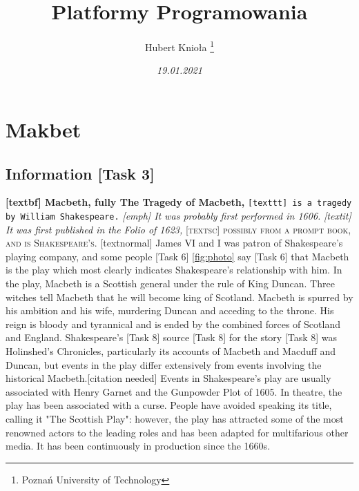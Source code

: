 \documentclass[12pt, letterpaper, twoside]{article}
\title{\Huge{\textbf{Platformy Programowania}}}
\author{Hubert Knioła \thanks{Poznań University of Technology}}
\date{\textit{19.01.2021}}
\begin{document}
\begin{titlepage}
\maketitle
\end{titlepage}

\tableofcontents

\newpage
\section{Makbet}
\subsection{Information [Task 3]}
\textbf{[textbf] Macbeth, fully The Tragedy of Macbeth,} 
\newline
\texttt{[texttt] is a tragedy by William Shakespeare.}
\newline
\emph{[emph] It was probably first performed in 1606.}
\newline
\textit{[textit] It was first published in the Folio of 1623,}
\newline
\textsc{[textsc] possibly from a prompt book, and is Shakespeare's.}
\newline
\textnormal{[textnormal] James VI and I  was  patron of Shakespeare's playing company,}
\newline
and some people [Task 6] \ref{fig:photo} say [Task 6] \pageref{tab:1} that Macbeth is the play which most clearly indicates Shakespeare's relationship with him. In the play, Macbeth is a Scottish general under the rule of King Duncan. Three witches tell Macbeth that he will become king of Scotland. Macbeth is spurred by his ambition and his wife, murdering Duncan and acceding to the throne. His reign is bloody and tyrannical and is ended by the combined forces of Scotland and England.
\newline
Shakespeare's [Task 8] \cite{firstbib} source  [Task 8] \cite{secondbib} for the story  [Task 8] \cite{thirdbib} was Holinshed's Chronicles, particularly its accounts of Macbeth and Macduff and Duncan, but events in the play differ extensively from events involving the historical Macbeth.[citation needed] Events in Shakespeare's play are usually associated with Henry Garnet and the Gunpowder Plot of 1605. In theatre, the play has been associated with a curse. People have avoided speaking its title, calling it "The Scottish Play": however, the play has attracted some of the most renowned actors to the leading roles and has been adapted for multifarious other media. It has been continuously in production since the 1660s.
\end{document}

